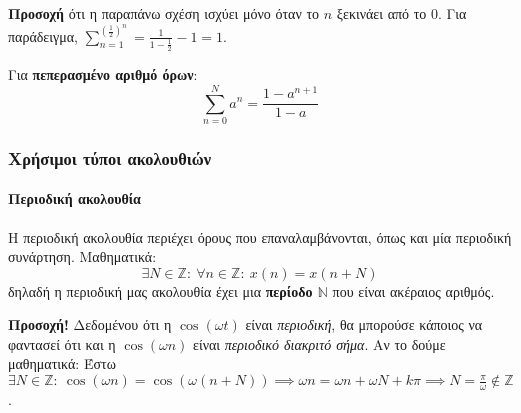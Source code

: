\documentclass[11pt,a4paper,notitlepage,fleqn]{article}
\begin{document}
\textbf{Προσοχή} ότι η παραπάνω σχέση ισχύει μόνο όταν το \( n \) ξεκινάει από το 0. Για παράδειγμα,
\( \sum_{n=1}^{\left(\frac{1}{2}\right)^n} = \frac{1}{1-\frac{1}{2}}-1 = 1 \).

Για \textbf{πεπερασμένο αριθμό όρων}:
\[
\sum_{n=0}^{N} a^n
= \frac{1-a^{n+1}}{1-a}
\]

\subsubsection{Χρήσιμοι τύποι ακολουθιών}
\paragraph{Περιοδική ακολουθία}
Η περιοδική ακολουθία περιέχει όρους που επαναλαμβάνονται, όπως και μία περιοδική συνάρτηση.
Μαθηματικά:
\[
\exists N \in \mathbb Z: \ \forall n \in \mathbb Z: \ x(n) = x(n+N)
\]
δηλαδή η περιοδική μας ακολουθία έχει μια \textbf{περίοδο \( \mathbb N \)} που είναι ακέραιος αριθμός.

\textbf{Προσοχή!} Δεδομένου ότι η \( \cos(\omega t) \) είναι \textit{περιοδική}, θα μπορούσε κάποιος
να φαντασεί ότι και η \( \cos(\omega n) \) είναι \textit{περιοδικό διακριτό σήμα}. Αν το δούμε μαθηματικά:
Έστω \( \exists N \in \mathbb Z:\ \cos(\omega n)=\cos\left( \omega (n+N) \right)
\implies \omega n = \omega n + \omega N + kπ \implies N = \frac{π}{\omega } \notin \mathbb Z \).
\end{document}
